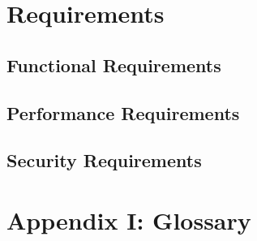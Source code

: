 \documentclass[english,titlepage,a4paper]{report}
\begin{document}
\chapter{Requirements}
\section{Functional Requirements}

\section{Performance Requirements}

\section{Security Requirements}


\chapter*{Appendix I: Glossary}
\end{document}
